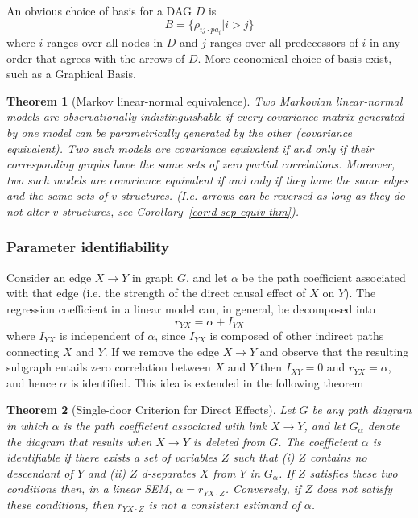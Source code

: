 \documentclass[11pt]{article}
\numberwithin{equation}{section}
\newtheorem{thm}{Theorem}[section]
\begin{document}
An obvious choice of basis for a DAG $D$ is
\begin{equation}
B = \{\rho_{ij\cdot pa_{i}} | i>j \} 
\end{equation}
where $i$ ranges over all nodes in $D$ and $j$ ranges over all predecessors of $i$ in any order that agrees with the arrows of $D$. More economical choice of basis exist, such as a Graphical Basis. 

\begin{thm}[Markov linear-normal equivalence]
Two Markovian linear-normal models are observationally indistinguishable if every covariance matrix generated by one model can be parametrically generated by the other (covariance equivalent). Two such models are covariance equivalent if and only if their corresponding graphs have the same sets of zero partial correlations. Moreover, two such models are covariance equivalent if and only if they have the same edges and the same sets of $v$-structures. (I.e. arrows can be reversed as long as they do not alter $v$-structures, see Corollary~\ref{cor:d-sep-equiv-thm}).
\end{thm}


\subsubsection{Parameter identifiability}

Consider an edge $X \rightarrow Y$ in graph $G$, and let $\alpha$ be the path coefficient associated with that edge (i.e. the strength of the direct causal effect of $X$ on $Y$). The regression coefficient in a linear model can, in general, be decomposed into 
\begin{equation}
r_{YX} = \alpha + I_{YX}
\end{equation}
where $I_{YX}$ is independent of $\alpha$, since $I_{YX}$ is composed of other indirect paths connecting $X$ and $Y$. If we remove the edge $X \rightarrow Y$ and observe that the resulting subgraph entails zero correlation between $X$ and $Y$ then $I_{XY}=0$ and $r_{YX}=\alpha$, and hence $\alpha$ is identified. This idea is extended in the following theorem
\begin{thm}[Single-door Criterion for Direct Effects] 
Let $G$ be any path diagram in which $\alpha$ is the path coefficient associated with link $X \rightarrow Y$, and let $G_\alpha$ denote the diagram that results when $X\rightarrow Y$ is deleted from $G$. The coefficient $\alpha$ is identifiable if there exists a set of variables $Z$ such that (i) $Z$ contains no descendant of $Y$ and (ii) $Z$ d-separates $X$ from $Y$ in $G_\alpha$. If $Z$ satisfies these two conditions then, in a linear SEM, $\alpha = r_{YX\cdot Z}$. Conversely, if $Z$ does not satisfy these conditions, then $r_{YX\cdot Z}$ is not a consistent estimand of $\alpha$. \label{thm:single-door-direct-effect}
\end{thm}
\end{document}
